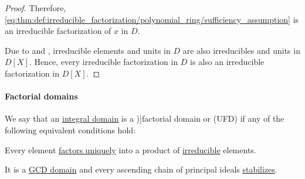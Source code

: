 \begin{proof}
  Therefore, \eqref{eq:thm:def:irreducible_factorization/polynomial_ring/sufficiency_assumption} is an irreducible factorization of \( x \) in \( D \).

  \NecessitySubProof* Due to  and , irreducible elements and units in \( D \) are also irreducibles and units in \( D[X] \). Hence, every irreducible factorization in \( D \) is also an irreducible factorization in \( D[X] \).
\end{proof}

\paragraph{Factorial domains}

\begin{definition}\label{def:factorial_domain}
  We say that an \hyperref[def:integral_domain]{integral domain} is a \term[ru=факториальное кольцо (\cite[def. 9.7.1]{Винберг2014})]{factorial domain} or  (UFD) if any of the following equivalent conditions hold:
  \begin{thmenum}
     Every element \hyperref[def:irreducible_factorization/unique]{factors uniquely} into a product of \hyperref[def:domain_divisibility/irreducible]{irreducible} elements.

     It is a \hyperref[def:gcd_domain]{GCD domain} and every ascending chain of principal ideals \hyperref[def:stabilizing_chain]{stabilizes}.
  \end{thmenum}
\end{definition}
